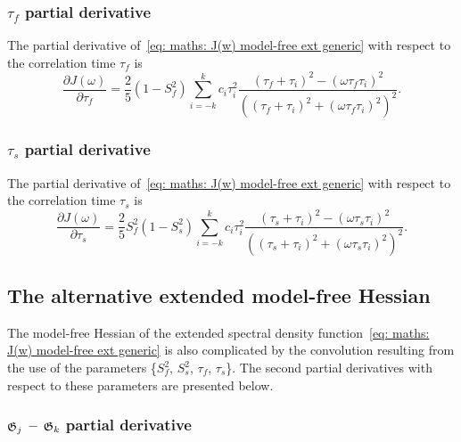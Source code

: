 \subsubsection{$\tau_f$ partial derivative}

The partial derivative of~\eqref{eq: maths: J(w) model-free ext generic} with respect to the correlation time $\tau_f$ is
\begin{equation}
    \frac{\partial J(\omega)}{\partial \tau_f} = \frac{2}{5} (1 - S^2_f) \sum_{i=-k}^k c_i \tau_i^2
        \frac{(\tau_f + \tau_i)^2 - (\omega \tau_f \tau_i)^2}{\left((\tau_f + \tau_i)^2 + (\omega \tau_f \tau_i)^2 \right)^2}.
\end{equation}



\subsubsection{$\tau_s$ partial derivative}

The partial derivative of~\eqref{eq: maths: J(w) model-free ext generic} with respect to the correlation time $\tau_s$ is
\begin{equation}
    \frac{\partial J(\omega)}{\partial \tau_s} = \frac{2}{5} S^2_f(1 - S^2_s) \sum_{i=-k}^k c_i \tau_i^2
        \frac{(\tau_s + \tau_i)^2 - (\omega \tau_s \tau_i)^2}{\left((\tau_s + \tau_i)^2 + (\omega \tau_s \tau_i)^2 \right)^2}.
\end{equation}





\newpage
\subsection{The alternative extended model-free Hessian}

The model-free Hessian of the extended spectral density function~\eqref{eq: maths: J(w) model-free ext generic} is also complicated by the convolution resulting from the use of the parameters \{$S^2_f$, $S^2_s$, $\tau_f$, $\tau_s$\}.  The second partial derivatives with respect to these parameters are presented below.



\subsubsection{$\mathfrak{G}_j$ -- $\mathfrak{G}_k$ partial derivative}

